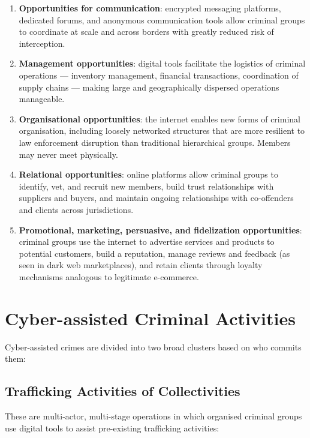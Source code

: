 \documentclass[11pt,a4paper,openany]{report}
\theoremstyle{definition}
\theoremstyle{plain}
\theoremstyle{remark}
\begin{document}
\begin{enumerate}
    \item \textbf{Opportunities for communication}: encrypted messaging platforms, dedicated forums, and anonymous communication tools allow criminal groups to coordinate at scale and across borders with greatly reduced risk of interception.

    \item \textbf{Management opportunities}: digital tools facilitate the logistics of criminal operations --- inventory management, financial transactions, coordination of supply chains --- making large and geographically dispersed operations manageable.

    \item \textbf{Organisational opportunities}: the internet enables new forms of criminal organisation, including loosely networked structures that are more resilient to law enforcement disruption than traditional hierarchical groups. Members may never meet physically.

    \item \textbf{Relational opportunities}: online platforms allow criminal groups to identify, vet, and recruit new members, build trust relationships with suppliers and buyers, and maintain ongoing relationships with co-offenders and clients across jurisdictions.

    \item \textbf{Promotional, marketing, persuasive, and fidelization opportunities}: criminal groups use the internet to advertise services and products to potential customers, build a reputation, manage reviews and feedback (as seen in dark web marketplaces), and retain clients through loyalty mechanisms analogous to legitimate e-commerce.
\end{enumerate}


\section{Cyber-assisted Criminal Activities}

Cyber-assisted crimes are divided into two broad clusters based on who commits them:

\subsection{Trafficking Activities of Collectivities}

These are multi-actor, multi-stage operations in which organised criminal groups use digital tools to assist pre-existing trafficking activities:
\end{document}
